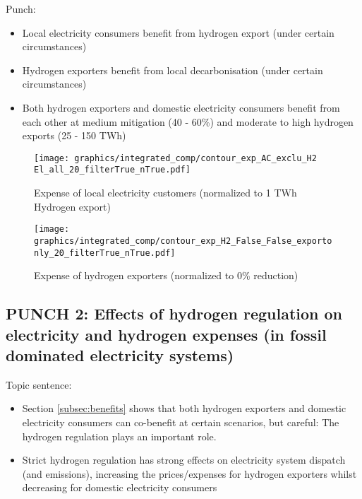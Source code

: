 Punch:
\begin{itemize}
    \item Local electricity consumers benefit from hydrogen export (under certain circumstances)
    \item Hydrogen exporters benefit from local decarbonisation (under certain circumstances)
    \item Both hydrogen exporters and domestic electricity consumers benefit from each other at medium mitigation (40 - 60\%) and moderate to high hydrogen exports (25 - 150 TWh)
\end{itemize}



\begin{figure*}[h!]
    \centering
    \begin{subfigure}[b]{0.49\linewidth}
        \centering
        \texttt{[image: graphics/integrated\_comp/contour\_exp\_AC\_exclu\_H2 El\_all\_20\_filterTrue\_nTrue.pdf]}
        \caption{Expense of local electricity customers (normalized to 1 TWh Hydrogen export)}
        \label{fig:expense_ac}
    \end{subfigure}
    \hfill
    \begin{subfigure}[b]{0.49\linewidth}
        \centering
        \texttt{[image: graphics/integrated\_comp/contour\_exp\_H2\_False\_False\_exportonly\_20\_filterTrue\_nTrue.pdf]}
        \caption{Expense of hydrogen exporters (normalized to 0\% \co reduction)}
        \label{fig:expense_h2}
    \end{subfigure}
    \hfill
    \caption{Normalized expenses of local electricity consumers (\ref{fig:expense_ac}) and hydrogen exporters (\ref{fig:expense_h2}). Local electricity consumers profit from increasing hydrogen exports, especially at low domestic mitigation and high exports. Hydrogen exporters profit from domestic mitigation at medium mitigation efforts.}
    \label{fig:expenses_default}
\end{figure*}


\subsection{PUNCH 2: Effects of hydrogen regulation on electricity and hydrogen expenses (in fossil dominated electricity systems)}
\label{subsec:benefits_rule}

Topic sentence:
\begin{itemize}
    \item Section \ref{subsec:benefits} shows that both hydrogen exporters and domestic electricity consumers can co-benefit at certain scenarios, but careful: The hydrogen regulation plays an important role.
    \item Strict hydrogen regulation has strong effects on electricity system dispatch (and emissions), increasing the prices/expenses for hydrogen exporters whilst decreasing for domestic electricity consumers
\end{itemize}

